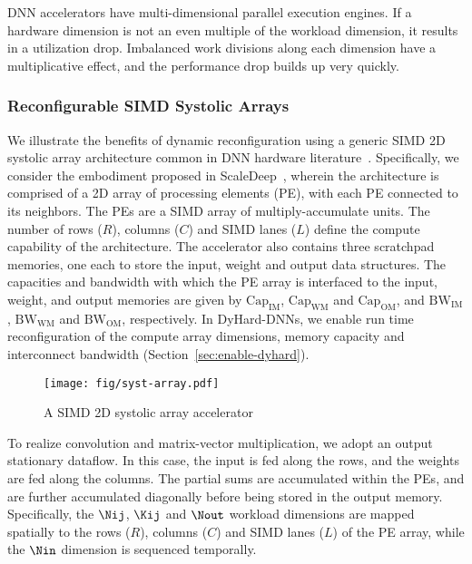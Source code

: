 DNN accelerators have multi-dimensional parallel execution engines.
If a hardware dimension is not an even multiple of the workload dimension, it results in a utilization drop.
Imbalanced work divisions along each dimension have a multiplicative effect, and the performance drop builds up very quickly.

\subsubsection{Reconfigurable SIMD Systolic Arrays} 
\label{sec:syst-array}

We illustrate the benefits of dynamic reconfiguration using a generic SIMD 2D systolic array architecture common in DNN hardware literature~\cite{venkataramani2017scaledeep,chen2017eyeriss,chen2014dadiannao}. 
Specifically, we consider the embodiment proposed in ScaleDeep~\cite{venkataramani2017scaledeep}, wherein the architecture is comprised of a 2D array of processing elements (PE), with each PE connected to its neighbors.
The PEs are a SIMD array of multiply-accumulate units.
The number of rows ($R$), columns ($C$) and SIMD lanes ($L$) define the compute capability of the architecture.
The accelerator also contains three scratchpad memories, one each to store the input, weight and output data structures.
The capacities and bandwidth with which the PE array is interfaced to the input, weight, and output memories are given by $\textrm{Cap}_\textrm{IM}$, $\textrm{Cap}_\textrm{WM}$ and $\textrm{Cap}_\textrm{OM}$, and $\textrm{BW}_\textrm{IM}$, $\textrm{BW}_\textrm{WM}$ and $\textrm{BW}_\textrm{OM}$, respectively.
In DyHard-DNNs, we enable run time reconfiguration of the compute array dimensions, memory capacity and interconnect bandwidth (Section~\ref{sec:enable-dyhard}).

\begin{figure}
    \centering
    \texttt{[image: fig/syst-array.pdf]}
    \caption{A SIMD 2D systolic array accelerator}
    \label{fig:systolic_array}
\end{figure}

To realize convolution and matrix-vector multiplication, we adopt an output stationary dataflow.
In this case, the input is fed along the rows, and the weights are fed along the columns.
The partial sums are accumulated within the PEs, and are further accumulated diagonally before being stored in the output memory.
Specifically, the $\Nij$, $\Kij$ and $\Nout$ workload dimensions are mapped spatially to the rows ($R$), columns ($C$) and SIMD lanes ($L$) of the PE array, while the $\Nin$ dimension is sequenced temporally.

